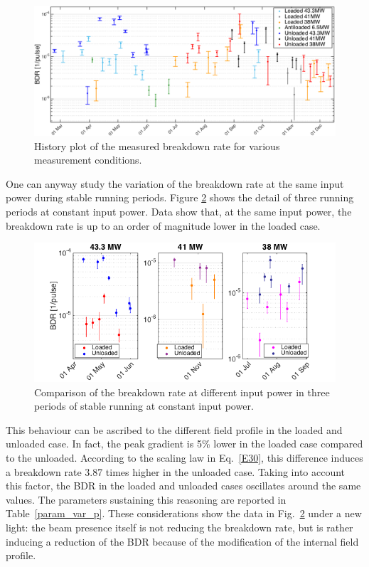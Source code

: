 \begin{landscape}

\begin{figure}[p]
\centering 
\includegraphics[scale=0.61]{pictures/bdr_hist_2.png}
\caption{History plot of the measured breakdown rate for various measurement conditions.}
\label{BDR_history}
\end{figure}
 
\end{landscape}

One can anyway study the variation of the breakdown rate at the same input power during stable running periods. Figure \ref{BDR_3sectors} shows the detail of three running periods at constant input power. Data show that, at the same input power, the breakdown rate is up to an order of magnitude lower in the loaded case. 

\begin{figure}[h]
\centering 
\includegraphics[scale=0.5]{pictures/BDR_zooms.png}
\caption{Comparison of the breakdown rate at different input power in three periods of stable running  at constant input power.}
\label{BDR_3sectors}
\end{figure}

This behaviour can be ascribed to the different field profile in the loaded and unloaded case. In fact, the peak gradient is 5\% lower in the loaded case compared to the unloaded. According to the scaling law in Eq.~\ref{E30}, this difference induces a breakdown rate 3.87 times higher in the unloaded case. Taking into account this factor, the BDR in the loaded and unloaded cases oscillates around the same values. The parameters sustaining this reasoning are reported in Table~\ref{param_var_p}.  These considerations show the data in Fig.~\ref{BDR_3sectors} under a new light: the beam presence itself is not reducing the breakdown rate, but is rather inducing a reduction of the BDR because of the modification of the internal field profile.

